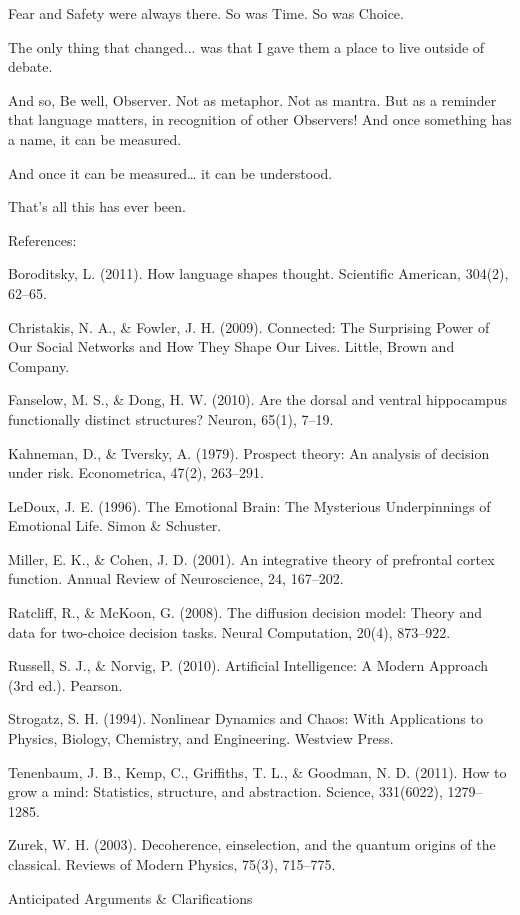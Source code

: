 \documentclass[11pt]{article}
\begin{document}
Fear and Safety were always there.
So was Time. So was Choice.

The only thing that changed... was that I gave them a place to live outside of debate.

And so, Be well, Observer.
Not as metaphor. Not as mantra.
But as a reminder that language matters, in recognition of other Observers!
And once something has a name,
it can be measured.

And once it can be measured…
it can be understood.

That’s all this has ever been. 

References:

Boroditsky, L. (2011). How language shapes thought. Scientific American, 304(2), 62–65.

Christakis, N. A., & Fowler, J. H. (2009). Connected: The Surprising Power of Our Social Networks and How They Shape Our Lives. Little, Brown and Company.

Fanselow, M. S., & Dong, H. W. (2010). Are the dorsal and ventral hippocampus functionally distinct structures? Neuron, 65(1), 7–19.

Kahneman, D., & Tversky, A. (1979). Prospect theory: An analysis of decision under risk. Econometrica, 47(2), 263–291.

LeDoux, J. E. (1996). The Emotional Brain: The Mysterious Underpinnings of Emotional Life. Simon & Schuster.

Miller, E. K., & Cohen, J. D. (2001). An integrative theory of prefrontal cortex function. Annual Review of Neuroscience, 24, 167–202.

Ratcliff, R., & McKoon, G. (2008). The diffusion decision model: Theory and data for two-choice decision tasks. Neural Computation, 20(4), 873–922.

Russell, S. J., & Norvig, P. (2010). Artificial Intelligence: A Modern Approach (3rd ed.). Pearson.

Strogatz, S. H. (1994). Nonlinear Dynamics and Chaos: With Applications to Physics, Biology, Chemistry, and Engineering. Westview Press.

Tenenbaum, J. B., Kemp, C., Griffiths, T. L., & Goodman, N. D. (2011). How to grow a mind: Statistics, structure, and abstraction. Science, 331(6022), 1279–1285.

Zurek, W. H. (2003). Decoherence, einselection, and the quantum origins of the classical. Reviews of Modern Physics, 75(3), 715–775.

Anticipated Arguments & Clarifications
\end{document}

